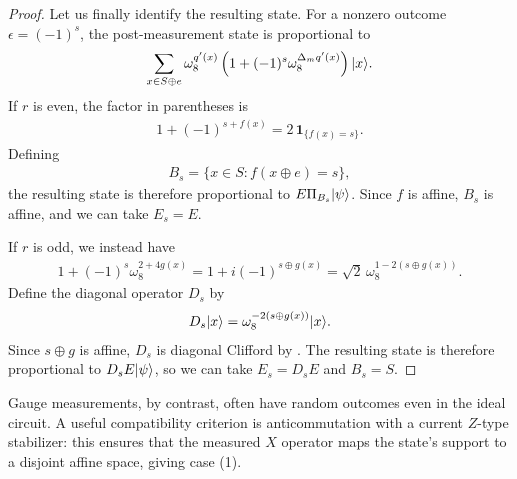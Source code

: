 \begin{proof}
    Let us finally identify the resulting state. For a nonzero outcome
    $\epsilon=(-1)^s$, the post-measurement state is proportional to
    \begin{align}
        \sum_{x\in S\oplus e}
        \omega_8^{q'(x)}
        \left(1+(-1)^s\omega_8^{\Delta_mq'(x)}\right)|x\rangle.
    \end{align}
    If $r$ is even, the factor in parentheses is
    \begin{align}
        1+(-1)^{s+f(x)}
        =2\,\mathbf{1}_{\{f(x)=s\}}.
    \end{align}
    Defining
    \begin{align}
        B_s=\{x\in S:f(x\oplus e)=s\},
    \end{align}
    the resulting state is therefore proportional to
    $E\Pi_{B_s}|\psi\rangle$. Since $f$ is affine, $B_s$ is affine,
    and we can take $E_s=E$.

    If $r$ is odd, we instead have
    \begin{align}
        1+(-1)^s\omega_8^{2+4g(x)}
        =1+i(-1)^{s\oplus g(x)}
        =\sqrt{2}\,\omega_8^{1-2(s\oplus g(x))}.
    \end{align}
    Define the diagonal operator $D_s$ by
    \begin{align}
        D_s|x\rangle
        =\omega_8^{-2(s\oplus g(x))}|x\rangle.
    \end{align}
    Since $s\oplus g$ is affine, $D_s$ is diagonal Clifford by
    . The resulting state is
    therefore proportional to $D_sE|\psi\rangle$, so we can take
    $E_s=D_sE$ and $B_s=S$.
\end{proof}

Gauge measurements, by contrast, often have random outcomes even in the ideal circuit. A useful compatibility criterion is anticommutation with a current $Z$-type stabilizer: this ensures that the measured $X$ operator maps the state's support to a disjoint affine space, giving case (1).

